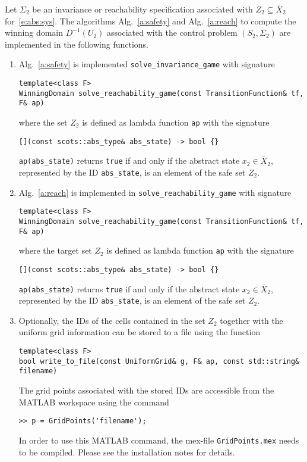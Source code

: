 \documentclass[a4paper]{amsart}
\begin{document}
Let $\Sigma_2$ be an invariance or reachability specification associated with $Z_2\subseteq \bar
X_2$ for~\eqref{e:abs:sys}.
The algorithms Alg.~\ref{a:safety} and Alg.~\ref{a:reach} to compute the winning
domain $D^{-1}(U_2)$ associated with the control problem $(S_2,\Sigma_2)$
are implemented in the following functions.
\begin{enumerate}
  \item Alg.~\ref{a:safety} is implemented {\tt solve\_invariance\_game} with signature 
\begin{lstlisting}[basicstyle=\small\ttfamily]
template<class F> 
WinningDomain solve_reachability_game(const TransitionFunction& tf, F& ap)
\end{lstlisting}
  where the set $Z_2$ is defined as lambda function {\tt ap} with the signature
\begin{lstlisting}[basicstyle=\small\ttfamily]
[](const scots::abs_type& abs_state) -> bool {}
\end{lstlisting}
  {\tt ap(abs\_state)} returns {\tt true} if and only if the abstract state $x_2\in\bar X_2$, represented by
  the ID {\tt abs\_state}, is  an element of the safe set $Z_2$.

  \item Alg.~\ref{a:reach} is implemented in {\tt solve\_reachability\_game} with signature 
\begin{lstlisting}[basicstyle=\small\ttfamily]
template<class F>
WinningDomain solve_reachability_game(const TransitionFunction& tf, F& ap)
\end{lstlisting}
  where the target set $Z_2$ is defined as lambda function {\tt ap} with the signature
\begin{lstlisting}[basicstyle=\small\ttfamily]
[](const scots::abs_type& abs_state) -> bool {}
\end{lstlisting}
  {\tt ap(abs\_state)} returns {\tt true} if and only if the abstract state $x_2\in\bar X_2$, represented by
  the ID {\tt abs\_state}, is  an element of the safe set $Z_2$.

  \item Optionally, the IDs of the cells contained in the set $Z_2$ together
  with the uniform grid information can be stored to a file using the function
\begin{lstlisting}[basicstyle=\small\ttfamily]
template<class F>
bool write_to_file(const UniformGrid& g, F& ap, const std::string& filename)
\end{lstlisting}
The grid points associated with the stored IDs are accessible from the MATLAB
workspace using the command
\begin{lstlisting}[basicstyle=\small\ttfamily]
>> p = GridPoints('filename');
\end{lstlisting}
In order to use this MATLAB command, the mex-file {\tt GridPoints.mex} needs to
be compiled. Please see the installation notes for details.

\end{enumerate}
\end{document}
